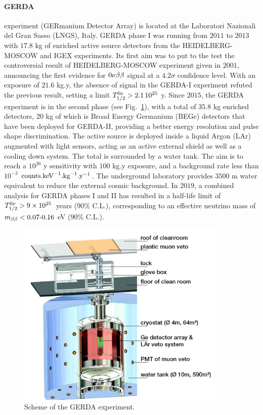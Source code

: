 \paragraph{GERDA} experiment (GERmanium Detector Array) is located at the Laboratori Nazionali del Gran Sasso (LNGS), Italy.
GERDA phase I was running from $2011$ to $2013$ with $17.8$ kg of enriched active source detectors from the HEIDELBERG-MOSCOW and IGEX experiments.
Its first aim was to put to the test the controversial result of HEIDELBERG-MOSCOW experiment given in $2001$, announcing the first evidence for $0\nu\beta\beta$ signal at a $4.2\sigma$ confidence level.
With an exposure of $21.6$ kg.y, the absence of signal in the GERDA-I experiment refuted the previous result, setting a limit $T_{1/2}^{0\nu}>2.1\, 10^{25}$ y.
Since $2015$, the GERDA experiment is in the second phase (see Fig.~\ref{fig:GERDA}), with a total of $35.8$ kg enriched detectors, $20$ kg of which is Broad Energy Germanium (BEGe) detectors that have been deployed for GERDA-II, providing a better energy resolution and pulse shape discrimination.
The active source is deployed inside a liquid Argon (LAr) augmented with light sensors, acting as an active external shield as well as a cooling down system.
The total is surrounded by a water tank.
The aim is to reach a $10^{26}$ y sensitivity with $100$ kg.y exposure, and a background rate less than $10^{-3}$ $\text{counts.keV}^{-1}\text{.kg}^{-1}\text{.y}^{-1}$.
The underground laboratory provides $3500$ m water equivalent to reduce the external cosmic background.
In $2019$, a combined analysis for GERDA phases I and II has resulted in a half-life limit of $T_{1/2}^{0\nu}>9\times 10^{25}$~years ($90$\% C.L.), corresponding to an effective neutrino mass of $m_{\beta\beta}<0.07\text{-}0.16$ eV ($90$\% C.L.).

\begin{figure}
  \centering
  \includegraphics[width=10cm]{neutrinophysics/fig_neutrinophysics/GERDA.png}
  \caption{Scheme of the GERDA experiment.
    \label{fig:GERDA}}
\end{figure}


